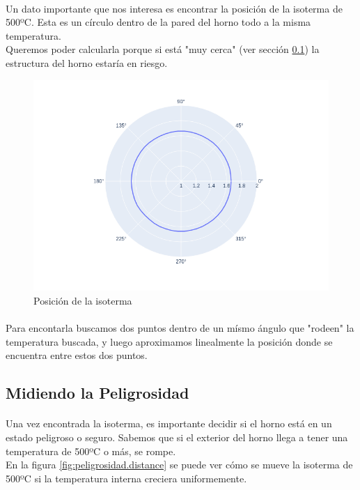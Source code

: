 \documentclass[12pt]{article}
\begin{document}
\paragraph{} Un dato importante que nos interesa es encontrar la posición de la isoterma de 500ºC. Esta es un círculo dentro de la pared del horno todo a la misma temperatura. \\
Queremos poder calcularla porque si está "muy cerca" (ver sección \ref{sec:peligrosidad.distance}) la estructura del horno estaría en riesgo. %

\begin{figure}[H]
\centering
\includegraphics[width=\textwidth]{test.isotherm.0}
\caption{Posición de la isoterma}
\label{fig:isotherm.pos}
\end{figure}

\paragraph{} Para encontarla buscamos dos puntos dentro de un mísmo ángulo que "rodeen" la temperatura buscada, y luego aproximamos linealmente la posición donde se encuentra entre estos dos puntos.


\subsection{Midiendo la Peligrosidad}
\label{sec:peligrosidad.distance}

\paragraph{} Una vez encontrada la isoterma, es importante decidir si el horno está en un estado peligroso o seguro. Sabemos que si el exterior del horno llega a tener una temperatura de 500ºC o más, se rompe. \\
En la figura \ref{fig:peligrosidad.distance} se puede ver cómo se mueve la isoterma de 500ºC si la temperatura interna creciera uniformemente. \\
\end{document}
